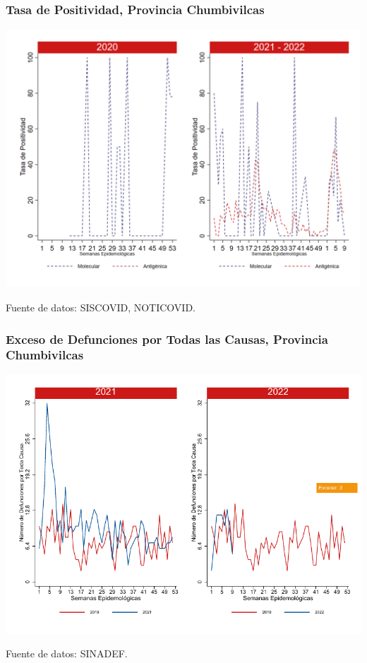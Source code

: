 \documentclass[xcolor=table]{beamer}
\begin{document}
\begin{frame}
	\frametitle{Tasa de Positividad, Provincia Chumbivilcas}
	\vspace{-.5cm}
	\begin{center}
		\includegraphics[width=0.8\linewidth, trim={0cm .5cm 0cm 0.2cm},clip]{../figuras/positividad_20_21_6.png}
	\end{center}
	{\tiny Fuente de datos: SISCOVID, NOTICOVID.}
\end{frame}

\begin{frame}
	\frametitle{Exceso de Defunciones por Todas las Causas, Provincia Chumbivilcas}
	\vspace{-.5cm}
	\begin{center}
		\includegraphics[width=0.8\linewidth, trim={0cm .5cm 0cm 0.2cm},clip]{../figuras/exceso_6.pdf}
	\end{center}
	{\tiny Fuente de datos: SINADEF.}
	
	\hyperlink{indicadores_provinciales}{}
\end{frame}
\end{document}
